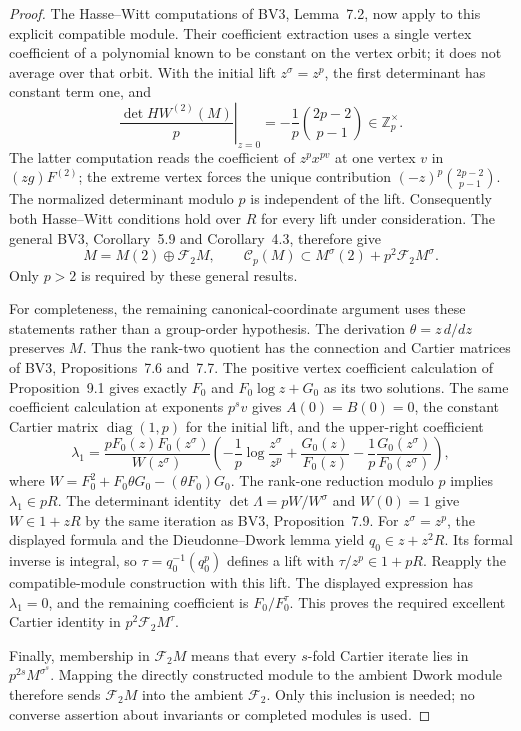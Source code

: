 \documentclass[11pt,a4paper]{article}
\theoremstyle{definition}\newtheorem{definition}[theorem]{Definition}
\theoremstyle{remark}\newtheorem{remark}[theorem]{Remark}
\numberwithin{equation}{section}
\begin{document}
\begin{proof}
The Hasse--Witt computations of BV3, Lemma~7.2, now apply to this
explicit compatible module. Their coefficient extraction uses a
single vertex coefficient of a polynomial known to be constant on
the vertex orbit; it does not average over that orbit. With the
initial lift $z^\sigma=z^p$, the first determinant has constant
term one, and
\[
 \left.\frac{\det HW^{(2)}(M)}p\right|_{z=0}
 =-\frac1p\binom{2p-2}{p-1}\in\mathbb Z_p^\times.
\]
The latter computation reads the coefficient of $z^px^{pv}$ at one
vertex $v$ in $(zg)F^{(2)}$; the extreme vertex forces the unique
contribution $(-z)^p\binom{2p-2}{p-1}$. The normalized determinant
modulo $p$ is independent of the lift. Consequently both
Hasse--Witt conditions hold over $R$ for every lift under consideration.
The general BV3, Corollary~5.9 and Corollary~4.3, therefore give
\[
 M=M(2)\oplus\mathscr F_2M,
 \qquad
 \mathscr C_p(M)\subset M^\sigma(2)+p^2\mathscr F_2M^\sigma.
\]
Only $p>2$ is required by these general results.

For completeness, the remaining canonical-coordinate argument
uses these statements rather than a group-order hypothesis.
The derivation $\theta=z\,d/dz$ preserves $M$. Thus the rank-two
quotient has the connection and Cartier matrices of BV3,
Propositions~7.6 and~7.7. The positive vertex coefficient calculation
of Proposition~9.1 gives exactly $F_0$ and
$F_0\log z+G_0$ as its two solutions. The same coefficient
calculation at exponents $p^sv$ gives $A(0)=B(0)=0$, the
constant Cartier matrix $\operatorname{diag}(1,p)$ for the
initial lift, and the upper-right coefficient
\[
 \lambda_1=
 \frac{pF_0(z)F_0(z^\sigma)}{W(z^\sigma)}
 \left(-\frac1p\log\frac{z^\sigma}{z^p}
 +\frac{G_0(z)}{F_0(z)}
 -\frac1p\frac{G_0(z^\sigma)}{F_0(z^\sigma)}\right),
\]
where $W=F_0^2+F_0\theta G_0-(\theta F_0)G_0$.
The rank-one reduction modulo $p$ implies $\lambda_1\in pR$.
The determinant identity
$\det\Lambda=pW/W^\sigma$ and $W(0)=1$ give $W\in1+zR$
by the same iteration as BV3, Proposition~7.9.
For $z^\sigma=z^p$, the displayed formula and the
Dieudonne--Dwork lemma yield $q_0\in z+z^2R$.
Its formal inverse is integral, so
$\tau=q_0^{-1}(q_0^p)$ defines a lift with
$\tau/z^p\in1+pR$. Reapply the compatible-module construction
with this lift. The displayed expression has $\lambda_1=0$,
and the remaining coefficient is $F_0/F_0^\tau$.
This proves the required excellent Cartier identity in
$p^2\mathscr F_2M^\tau$.

Finally, membership in $\mathscr F_2M$ means that every $s$-fold
Cartier iterate lies in $p^{2s}M^{\sigma^s}$. Mapping the directly
constructed module to the ambient Dwork module therefore sends
$\mathscr F_2M$ into the ambient $\mathscr F_2$.
Only this inclusion is needed; no converse assertion about
invariants or completed modules is used.
\end{proof}
\end{document}
